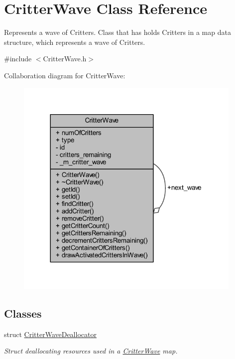 \hypertarget{class_critter_wave}{\section{Critter\+Wave Class Reference}
\label{class_critter_wave}
}


Represents a wave of Critters. Class that has holds Critters in a map data structure, which represents a wave of Critters.  




{\ttfamily \#include $<$Critter\+Wave.\+h$>$}



Collaboration diagram for Critter\+Wave\+:\nopagebreak
\begin{figure}[H]
\begin{center}
\leavevmode
\includegraphics[width=308pt]{class_critter_wave__coll__graph}
\end{center}
\end{figure}
\subsection*{Classes}
\begin{DoxyCompactItemize}
\item 
struct \hyperlink{struct_critter_wave_1_1_critter_wave_deallocator}{Critter\+Wave\+Deallocator}
\begin{DoxyCompactList}\small\item\em Struct deallocating resources used in a \hyperlink{class_critter_wave}{Critter\+Wave} map. \end{DoxyCompactList}\end{DoxyCompactItemize}
